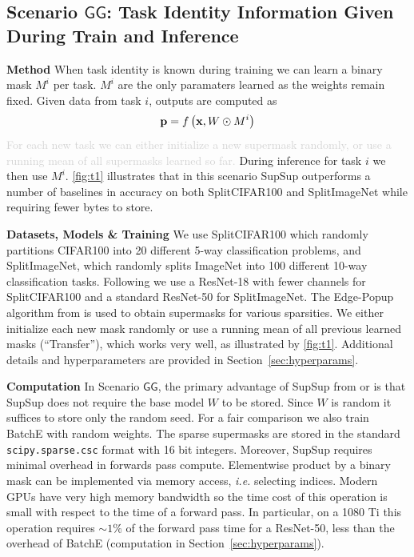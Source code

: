 \documentclass{article}
\newcommand{\ac}{SupSup\xspace}
\newcommand{\comments}[1]{#1}
\newcommand{\comments}[1]{}
\newcommand{\removed}[1]{\comments{\textcolor{lightgray}{#1}}}
\newcommand{\casename}[1]{\ensuremath{\mathsf{#1}}\xspace}
\begin{document}
\subsection{Scenario \casename{GG}: Task Identity Information Given During Train and Inference} \label{sec:S1}
\textbf{Method} When task identity is known during training we can learn a binary mask $M^i$ per task. $M^i$ are the only paramaters learned as the weights remain fixed. Given data from task $i$, outputs are computed as
\begin{equation} \label{eq:known-task-id}
    \mathbf{p} = f\left( \mathbf{x}, W \odot M^i \right)
\end{equation}
\removed{For each new task we can either initialize a new supermask randomly, or use a running mean of all supermasks learned so far.}
During inference for task $i$ we then use $M^i$. \autoref{fig:t1} illustrates that in this scenario \ac outperforms a number of baselines in accuracy 
on both SplitCIFAR100 and SplitImageNet 
while requiring fewer bytes to store.

\textbf{Datasets, Models \& Training } We use SplitCIFAR100 which randomly partitions CIFAR100 into 20 different 5-way classification problems, and SplitImageNet, which randomly splits ImageNet \cite{imagenet} into 100 different 10-way classification tasks. 
Following \cite{wen2020batchensemble} we use a ResNet-18 with fewer channels for SplitCIFAR100 and a standard ResNet-50 \cite{he2016deep} for SplitImageNet. The Edge-Popup algorithm from \cite{ramanujan2019s} is used to obtain supermasks for various sparsities. We either initialize each new mask randomly or use a running mean of all previous learned masks (``Transfer''), which works very well, as illustrated by \autoref{fig:t1}. Additional details and hyperparameters are provided in Section~\ref{sec:hyperparams}.

\textbf{Computation } In Scenario \casename{GG}, the primary advantage of \ac from \citet{mallya2018packnet} or \citet{wen2020batchensemble} is that \ac does not require the base model $W$ to be stored. Since $W$ is random it suffices to store only the random seed. For a fair comparison we also train BatchE \cite{wen2020batchensemble} with random weights. The sparse supermasks are stored in the standard \texttt{scipy.sparse.csc} format with 16 bit integers. Moreover, \ac requires minimal overhead in forwards pass compute. Elementwise product by a binary mask can be implemented via memory access, \textit{i.e.} selecting indices. Modern GPUs have very high memory bandwidth so the time cost of this operation is small with respect to the time of a forward pass. In particular, on a 1080 Ti this operation requires $\sim 1\%$ of the forward pass time for a ResNet-50, less than the overhead of BatchE (computation in Section~\ref{sec:hyperparams}).
\end{document}
